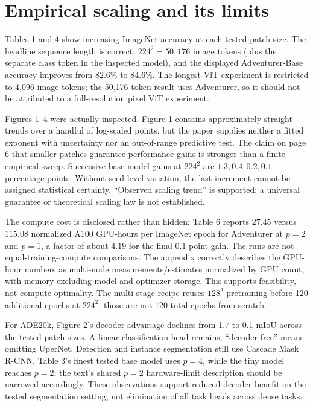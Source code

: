 \documentclass[10pt]{article}
\begin{document}
\section*{Empirical scaling and its limits}
Tables 1 and 4 show increasing ImageNet accuracy at each tested patch size. The headline sequence length is correct: \(224^2=50{,}176\) image tokens (plus the separate class token in the inspected model), and the displayed Adventurer-Base accuracy improves from \(82.6\%\) to \(84.6\%\). The longest ViT experiment is restricted to 4,096 image tokens; the 50,176-token result uses Adventurer, so it should not be attributed to a full-resolution pixel ViT experiment.\par
Figures 1–4 were actually inspected. Figure 1 contains approximately straight trends over a handful of log-scaled points, but the paper supplies neither a fitted exponent with uncertainty nor an out-of-range predictive test. The claim on page 6 that smaller patches guarantee performance gains is stronger than a finite empirical sweep. Successive base-model gains at \(224^2\) are \(1.3,0.4,0.2,0.1\) percentage points. Without seed-level variation, the last increment cannot be assigned statistical certainty. “Observed scaling trend” is supported; a universal guarantee or theoretical scaling law is not established.\par
The compute cost is disclosed rather than hidden: Table 6 reports \(27.45\) versus \(115.08\) normalized A100 GPU-hours per ImageNet epoch for Adventurer at \(p=2\) and \(p=1\), a factor of about \(4.19\) for the final \(0.1\)-point gain. The runs are not equal-training-compute comparisons. The appendix correctly describes the GPU-hour numbers as multi-node measurements/estimates normalized by GPU count, with memory excluding model and optimizer storage. This supports feasibility, not compute optimality. The multi-stage recipe reuses \(128^2\) pretraining before 120 additional epochs at \(224^2\); those are not 120 total epochs from scratch.\par
For ADE20k, Figure 2’s decoder advantage declines from 1.7 to 0.1 mIoU across the tested patch sizes. A linear classification head remains; “decoder-free” means omitting UperNet. Detection and instance segmentation still use Cascade Mask R-CNN. Table 3’s finest tested base model uses \(p=4\), while the tiny model reaches \(p=2\); the text’s shared \(p=2\) hardware-limit description should be narrowed accordingly. These observations support reduced decoder benefit on the tested segmentation setting, not elimination of all task heads across dense tasks.\par
\end{document}
